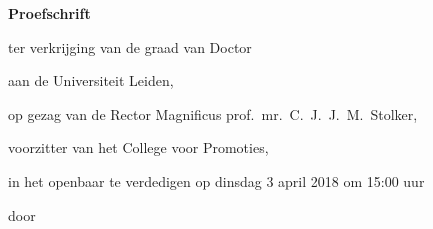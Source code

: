  \begin{titlepage}

\begin{center}








\vspace*{2\bigskipamount}

{\makeatletter
\titlestyle\bfseries\LARGE\@title
\makeatother}

{\makeatletter
\ifx\@subtitle\undefined\else
    \bigskip
    \titlefont\titleshape\Large\@subtitle
\fi
\makeatother}

\vfill


{\Large\titlefont\bfseries Proefschrift}

\bigskip
\bigskip

ter verkrijging van de graad van Doctor

aan de Universiteit Leiden,

op gezag van de Rector Magnificus prof.~mr.~C.~J.~J.~M.~Stolker,

voorzitter van het College voor Promoties,

in het openbaar te verdedigen op dinsdag 3 april 2018 om 15:00 uur

\bigskip
\bigskip

door

\bigskip
\bigskip

\makeatletter
{\Large\titlefont\bfseries\@firstname\ {\titleshape\@lastname}}
\makeatother


\end{center}
\end{titlepage}

